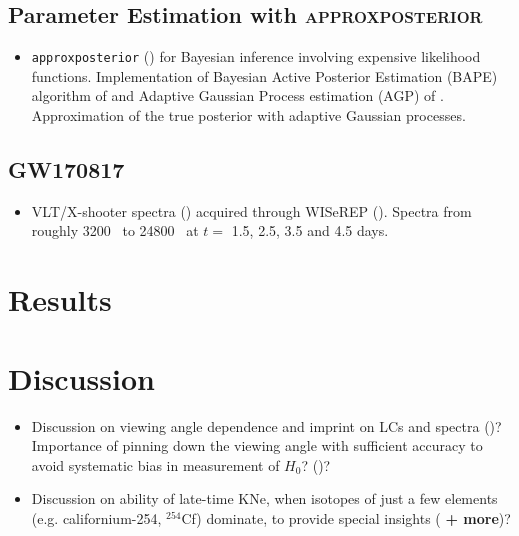 \documentclass[twocolumn]{aastex63}
\begin{document}
\subsection{Parameter Estimation with \textsc{approxposterior}}\label{ssc:approxposterior}
\begin{itemize}
    \item \texttt{approxposterior} (\citealt{fleming18, fleming20}) for Bayesian inference involving expensive likelihood functions. Implementation of Bayesian Active Posterior Estimation (BAPE) algorithm of \cite{kandasamy17} and Adaptive Gaussian Process estimation (AGP) of \cite{wang18}. Approximation of the true posterior with adaptive Gaussian processes.
\end{itemize}

\subsection{GW170817}\label{ssc:GW170817}
\begin{itemize}
    \item VLT/X-shooter spectra (\citealt{pian17, smartt17}) acquired through WISeREP (\citealt{yaron12}). Spectra from roughly 3200~\text{\AA} to 24800~\text{\AA} at $t=$ 1.5, 2.5, 3.5 and 4.5 days.
\end{itemize}

\section{Results}\label{sec:results}


\section{Discussion}\label{sec:disco}
\begin{itemize}
    \item Discussion on viewing angle dependence and imprint on LCs and spectra (\citealt{darbha20, korobkin20})? Importance of pinning down the viewing angle with sufficient accuracy to avoid systematic bias in measurement of $H_0$? (\citealt{chen20})?
    
    \item Discussion on ability of late-time KNe, when isotopes of just a few elements (e.g. californium-254, ${}^{254}$Cf) dominate, to provide special insights (\citealt{villar18, wanajo18, zhu18, kasliwal19, wu19} \textbf{+ more})? 
\end{itemize}
\end{document}
